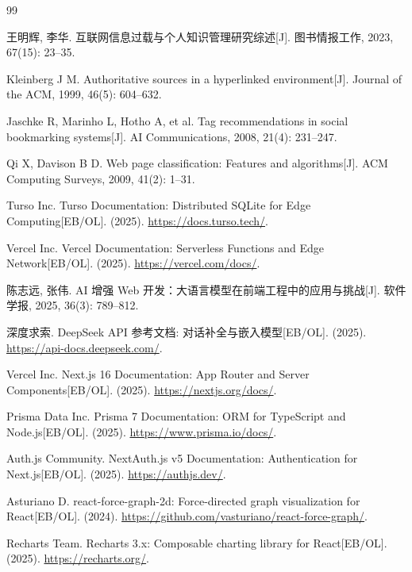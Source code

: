 \documentclass[12pt,a4paper]{ctexart}
\begin{document}
\begin{thebibliography}{99}

王明辉, 李华. 互联网信息过载与个人知识管理研究综述[J]. 图书情报工作, 2023, 67(15): 23--35.

Kleinberg J M. Authoritative sources in a hyperlinked environment[J]. Journal of the ACM, 1999, 46(5): 604--632.

Jaschke R, Marinho L, Hotho A, et al. Tag recommendations in social bookmarking systems[J]. AI Communications, 2008, 21(4): 231--247.

Qi X, Davison B D. Web page classification: Features and algorithms[J]. ACM Computing Surveys, 2009, 41(2): 1--31.

Turso Inc. Turso Documentation: Distributed SQLite for Edge Computing[EB/OL]. (2025). \url{https://docs.turso.tech/}.

Vercel Inc. Vercel Documentation: Serverless Functions and Edge Network[EB/OL]. (2025). \url{https://vercel.com/docs/}.

陈志远, 张伟. AI 增强 Web 开发：大语言模型在前端工程中的应用与挑战[J]. 软件学报, 2025, 36(3): 789--812.

深度求索. DeepSeek API 参考文档: 对话补全与嵌入模型[EB/OL]. (2025). \url{https://api-docs.deepseek.com/}.

Vercel Inc. Next.js 16 Documentation: App Router and Server Components[EB/OL]. (2025). \url{https://nextjs.org/docs/}.

Prisma Data Inc. Prisma 7 Documentation: ORM for TypeScript and Node.js[EB/OL]. (2025). \url{https://www.prisma.io/docs/}.

Auth.js Community. NextAuth.js v5 Documentation: Authentication for Next.js[EB/OL]. (2025). \url{https://authjs.dev/}.

Asturiano D. react-force-graph-2d: Force-directed graph visualization for React[EB/OL]. (2024). \url{https://github.com/vasturiano/react-force-graph/}.

Recharts Team. Recharts 3.x: Composable charting library for React[EB/OL]. (2025). \url{https://recharts.org/}.

\end{thebibliography}
\end{document}
